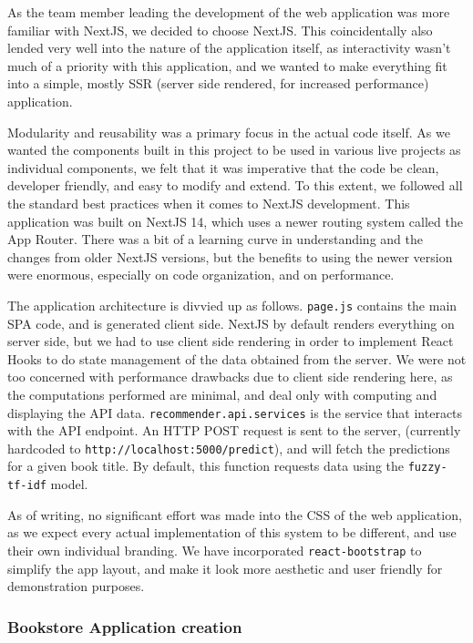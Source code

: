 As the team member leading the development of the web application was more familiar with NextJS, we decided to choose NextJS. This coincidentally also lended very well into the nature of the application itself, as interactivity wasn't much of a priority with this application, and we wanted to make everything fit into a simple, mostly SSR (server side rendered, for increased performance) application.

Modularity and reusability was a primary focus in the actual code itself. As we wanted the components built in this project to be used in various live projects as individual components, we felt that it was imperative that the code be clean, developer friendly, and easy to modify and extend. To this extent, we followed all the standard best practices when it comes to NextJS development. This application was built on NextJS 14, which uses a newer routing system called the App Router. There was a bit of a learning curve in understanding and the changes from older NextJS versions, but the benefits to using the newer version were enormous, especially on code organization, and on performance.

The application architecture is divvied up as follows.
\texttt{page.js} contains the main SPA code, and is generated client side. NextJS by default renders everything on server side, but we had to use client side rendering in order to implement React Hooks to do state management of the data obtained from the server. We were not too concerned with performance drawbacks due to client side rendering here, as the computations performed are minimal, and deal only with computing and displaying the API data.
\texttt{recommender.api.services} is the service that interacts with the API endpoint. An HTTP POST request is sent to the server, (currently hardcoded to \texttt{http://localhost:5000/predict}), and will fetch the predictions for a given book title. By default, this function requests data using the \texttt{fuzzy-tf-idf} model.

As of writing, no significant effort was made into the CSS of the web application, as we expect every actual implementation of this system to be different, and use their own individual branding. We have incorporated \texttt{react-bootstrap} to simplify the app layout, and make it look more aesthetic and user friendly for demonstration purposes.

\subsubsection{Bookstore Application creation}
    